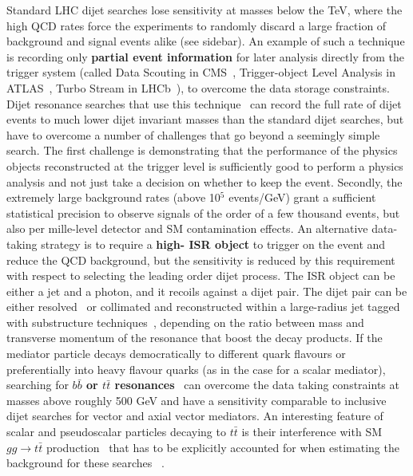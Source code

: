 Standard LHC dijet searches lose sensitivity at masses below the TeV, where the high QCD
rates force the experiments to randomly discard a large fraction of background and
signal events alike (see sidebar). %
An example of such a technique is recording only \textbf{partial event information} for later analysis directly 
from the trigger system (called Data Scouting in CMS~\cite{CMS-PAS-EXO-16-056},
Trigger-object Level Analysis in ATLAS~\cite{Aaboud:2016leb}, Turbo Stream in LHCb~\cite{Aaij:2016rxn}),
to overcome the data storage constraints. 
Dijet resonance searches that use this technique~\cite{CMS-PAS-EXO-16-056,ATLAS:2016xiv}
can record the full rate of dijet events to much lower dijet invariant masses than the standard dijet
searches, but have to overcome a number of challenges that go beyond
a seemingly simple search. The first challenge is demonstrating that the
performance of the physics objects reconstructed at the trigger level is sufficiently good
to perform a physics analysis and not just take a decision on whether to keep the event.
Secondly, the extremely large background rates (above 10$^5$ events/GeV) grant
a sufficient statistical precision to observe signals of the order of a few thousand events,
but also per mille-level detector and SM contamination effects. 
An alternative data-taking strategy is to require a \textbf{high-\pt{} ISR object} to trigger
on the event and reduce the QCD background, but the sensitivity is reduced by this requirement with
respect to selecting the leading order dijet process. The ISR object can be either a jet and a photon,
and it recoils against a dijet pair. The dijet pair can be either resolved~\cite{ATLAS:2016bvn} or
collimated and reconstructed within a large-radius jet tagged with substructure techniques~\cite{Sirunyan:2017nvi},
depending on the ratio between mass and transverse momentum of the resonance
that boost the decay products. If the mediator particle decays democratically to
different quark flavours or preferentially into heavy flavour quarks (as in the case for a scalar mediator),
searching for \textbf{$b\bar{b}$ or $t\bar{t}$ resonances}~\cite{lowMassDiB,CMS-PAS-HIG-16-025} 
can overcome the data taking constraints 
at masses above roughly 500 GeV and have a sensitivity comparable to inclusive 
dijet searches for vector and axial vector mediators. An interesting feature of 
scalar and pseudoscalar particles decaying to $t\bar{t}$ 
is their interference with SM $gg \rightarrow t\bar{t}$ production~\cite{Djouadi:2016ack}
that has to be explicitly accounted for when estimating the background for these searches
~\cite{Aaboud:2017hnm}. 

